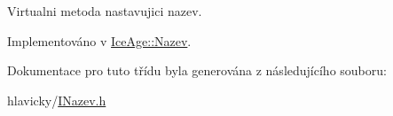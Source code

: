 Virtualni metoda nastavujici nazev. 



Implementováno v \hyperlink{classIceAge_1_1Nazev_ad5ad071231518f88e0699ac668d73b99}{Ice\+Age\+::\+Nazev}.



Dokumentace pro tuto třídu byla generována z následujícího souboru\+:\begin{DoxyCompactItemize}
\item 
hlavicky/\hyperlink{INazev_8h}{I\+Nazev.\+h}\end{DoxyCompactItemize}
